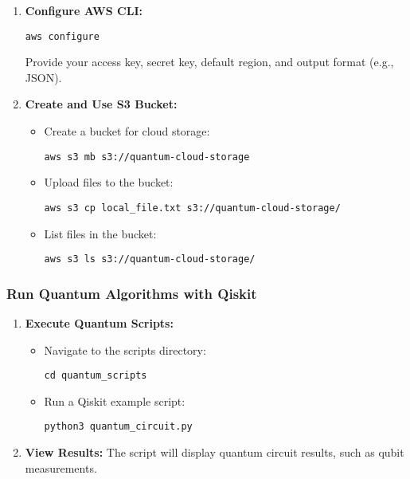 \documentclass[12pt,a4paper]{article}
\begin{document}
\begin{enumerate}
    \item \textbf{Configure AWS CLI:}
    \begin{verbatim}
aws configure
    \end{verbatim}
    Provide your access key, secret key, default region, and output format (e.g., JSON).

    \item \textbf{Create and Use S3 Bucket:}
    \begin{itemize}
        \item Create a bucket for cloud storage:
        \begin{verbatim}
aws s3 mb s3://quantum-cloud-storage
        \end{verbatim}
        \item Upload files to the bucket:
        \begin{verbatim}
aws s3 cp local_file.txt s3://quantum-cloud-storage/
        \end{verbatim}
        \item List files in the bucket:
        \begin{verbatim}
aws s3 ls s3://quantum-cloud-storage/
        \end{verbatim}
    \end{itemize}
\end{enumerate}

\subsubsection{Run Quantum Algorithms with Qiskit}

\begin{enumerate}
    \item \textbf{Execute Quantum Scripts:}
    \begin{itemize}
        \item Navigate to the scripts directory:
        \begin{verbatim}
cd quantum_scripts
        \end{verbatim}
        \item Run a Qiskit example script:
        \begin{verbatim}
python3 quantum_circuit.py
        \end{verbatim}
    \end{itemize}

    \item \textbf{View Results:}
    The script will display quantum circuit results, such as qubit measurements.
\end{enumerate}
\end{document}
